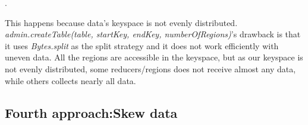 \par
 . 
\par
This happens because data's keyspace is not evenly distributed. \textit{admin.createTable(table, startKey, endKey, numberOfRegions)}'s drawback is that it uses \textit{Bytes.split} as the split strategy and it does not work efficiently with uneven data. All the regions are accessible in the keyspace, but as our keyspace is not evenly distributed, some reducers/regions does not receive almost any data, while others collects nearly all data.



\subsection{Fourth approach:Skew data}

